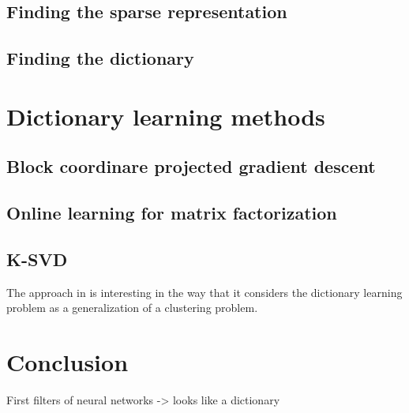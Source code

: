 \documentclass[a4paper,11pt]{article}
\begin{document}
\subsection{Finding the sparse representation}
\subsection{Finding the dictionary}



\section{Dictionary learning methods}
\subsection{Block coordinare projected gradient descent}
\subsection{Online learning for matrix factorization}
\subsection{K-SVD}
The approach in \cite{aharon06} is interesting in the way that it considers the dictionary learning problem as a generalization of a clustering problem.

\section{Conclusion}
First filters of neural networks -> looks like a dictionary
\end{document}
